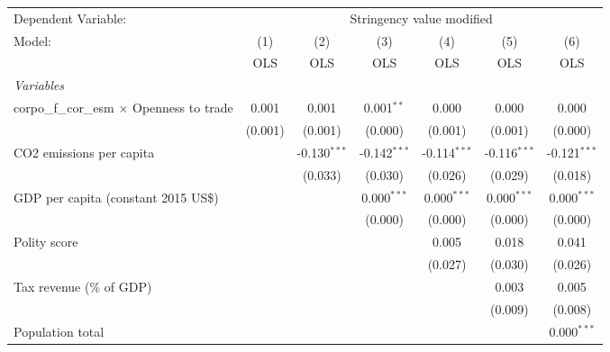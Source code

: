
\begingroup
\centering
\begin{tabular}{lcccccc}
   \toprule
   Dependent Variable: & \multicolumn{6}{c}{Stringency value modified}\\
   Model:                                            & (1)     & (2)            & (3)            & (4)            & (5)            & (6)\\  
                                                     &  OLS    & OLS            & OLS            & OLS            & OLS            & OLS\\  
   \midrule
   \emph{Variables}\\
   corpo\_f\_cor\_esm $\times$ Openness to trade     & 0.001   & 0.001          & 0.001$^{**}$   & 0.000          & 0.000          & 0.000\\   
                                                     & (0.001) & (0.001)        & (0.000)        & (0.001)        & (0.001)        & (0.000)\\   
   CO2 emissions per capita                          &         & -0.130$^{***}$ & -0.142$^{***}$ & -0.114$^{***}$ & -0.116$^{***}$ & -0.121$^{***}$\\   
                                                     &         & (0.033)        & (0.030)        & (0.026)        & (0.029)        & (0.018)\\   
   GDP per capita (constant 2015 US\$)               &         &                & 0.000$^{***}$  & 0.000$^{***}$  & 0.000$^{***}$  & 0.000$^{***}$\\   
                                                     &         &                & (0.000)        & (0.000)        & (0.000)        & (0.000)\\   
   Polity score                                      &         &                &                & 0.005          & 0.018          & 0.041\\   
                                                     &         &                &                & (0.027)        & (0.030)        & (0.026)\\   
   Tax revenue (\% of GDP)                           &         &                &                &                & 0.003          & 0.005\\   
                                                     &         &                &                &                & (0.009)        & (0.008)\\   
   Population total                                  &         &                &                &                &                & 0.000$^{***}$\\   

\end{tabular}
